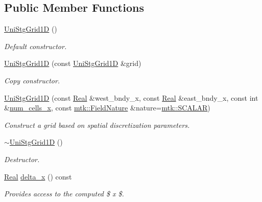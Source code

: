 \subsection*{Public Member Functions}
\begin{DoxyCompactItemize}
\item 
\hyperlink{classmtk_1_1UniStgGrid1D_ab0c1bb8afad2420fdb4434eb21bdec82}{Uni\-Stg\-Grid1\-D} ()
\begin{DoxyCompactList}\small\item\em Default constructor. \end{DoxyCompactList}\item 
\hyperlink{classmtk_1_1UniStgGrid1D_a56d698e803070d96601b46f470bfef0b}{Uni\-Stg\-Grid1\-D} (const \hyperlink{classmtk_1_1UniStgGrid1D}{Uni\-Stg\-Grid1\-D} \&grid)
\begin{DoxyCompactList}\small\item\em Copy constructor. \end{DoxyCompactList}\item 
\hyperlink{classmtk_1_1UniStgGrid1D_ae19250f0cddef7a05c4a73a90991a26a}{Uni\-Stg\-Grid1\-D} (const \hyperlink{group__c01-roots_gac080bbbf5cbb5502c9f00405f894857d}{Real} \&west\-\_\-bndy\-\_\-x, const \hyperlink{group__c01-roots_gac080bbbf5cbb5502c9f00405f894857d}{Real} \&east\-\_\-bndy\-\_\-x, const int \&\hyperlink{classmtk_1_1UniStgGrid1D_af1b3729d8afa07be5b2775ed68015b80}{num\-\_\-cells\-\_\-x}, const \hyperlink{group__c02-enums_ga4c54f2a329cfb4e56213b02a259d19e2}{mtk\-::\-Field\-Nature} \&nature=\hyperlink{namespacemtk_ga4c54f2a329cfb4e56213b02a259d19e2af481d45bd70d41381c7d72e200889205}{mtk\-::\-S\-C\-A\-L\-A\-R})
\begin{DoxyCompactList}\small\item\em Construct a grid based on spatial discretization parameters. \end{DoxyCompactList}\item 
\hyperlink{classmtk_1_1UniStgGrid1D_a609a8793d238d241f9b11c3afed8d24d}{$\sim$\-Uni\-Stg\-Grid1\-D} ()
\begin{DoxyCompactList}\small\item\em Destructor. \end{DoxyCompactList}\item 
\hyperlink{group__c01-roots_gac080bbbf5cbb5502c9f00405f894857d}{Real} \hyperlink{classmtk_1_1UniStgGrid1D_a6e7173b01241632cf509496d66b9f74c}{delta\-\_\-x} () const 
\begin{DoxyCompactList}\small\item\em Provides access to the computed \$  x \$. \end{DoxyCompactList}\item 

\end{DoxyCompactItemize}
